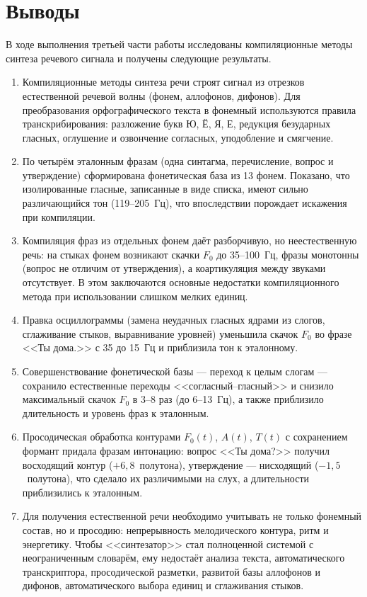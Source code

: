 \section{Выводы}

В ходе выполнения третьей части работы исследованы компиляционные методы
синтеза речевого сигнала и получены следующие результаты.

\begin{enumerate}
	\item Компиляционные методы синтеза речи строят сигнал из отрезков
	естественной речевой волны (фонем, аллофонов, дифонов). Для
	преобразования орфографического текста в фонемный используются правила
	транскрибирования: разложение букв Ю, Ё, Я, Е, редукция безударных
	гласных, оглушение и озвончение согласных, уподобление и смягчение.

	\item По четырём эталонным фразам (одна синтагма, перечисление, вопрос
	и утверждение) сформирована фонетическая база из 13 фонем. Показано,
	что изолированные гласные, записанные в виде списка, имеют сильно
	различающийся тон (119--205~Гц), что впоследствии порождает искажения
	при компиляции.

	\item Компиляция фраз из отдельных фонем даёт разборчивую, но
	неестественную речь: на стыках фонем возникают скачки $F_0$ до
	35--100~Гц, фразы монотонны (вопрос не отличим от утверждения), а
	коартикуляция между звуками отсутствует. В этом заключаются основные
	недостатки компиляционного метода при использовании слишком мелких
	единиц.

	\item Правка осциллограммы (замена неудачных гласных ядрами из слогов,
	сглаживание стыков, выравнивание уровней) уменьшила скачок $F_0$ во
	фразе <<Ты дома.>> с 35 до 15~Гц и приблизила тон к эталонному.

	\item Совершенствование фонетической базы --- переход к целым слогам
	--- сохранило естественные переходы <<согласный--гласный>> и снизило
	максимальный скачок $F_0$ в 3--8 раз (до 6--13~Гц), а также
	приблизило длительность и уровень фраз к эталонным.

	\item Просодическая обработка контурами $F_0(t)$, $A(t)$, $T(t)$ с
	сохранением формант придала фразам интонацию: вопрос <<Ты дома?>>
	получил восходящий контур ($+6{,}8$~полутона), утверждение ---
	нисходящий ($-1{,}5$~полутона), что сделало их различимыми на слух, а
	длительности приблизились к эталонным.

	\item Для получения естественной речи необходимо учитывать не только
	фонемный состав, но и просодию: непрерывность мелодического контура,
	ритм и энергетику. Чтобы <<синтезатор>> стал полноценной системой с
	неограниченным словарём, ему недостаёт анализа текста, автоматического
	транскриптора, просодической разметки, развитой базы аллофонов и
	дифонов, автоматического выбора единиц и сглаживания стыков.
\end{enumerate}


